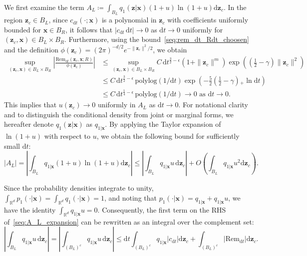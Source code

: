 We first examine the term $A_L\coloneq\int_{B_L}q_1(\bm z|\bm x)(1+u)\ln(1+u)\mathrm d\bm z_c$. In the region $\bm z_c\in B_L$, since $c_{\mathrm dt}(\cdot;\bm x)$ is a polynomial in $\bm z_c$ 
with coefficients uniformly bounded for $\bm x\in B_R$, it follows that $|c_{\mathrm dt}\,\mathrm dt|\rightarrow0$ as $\mathrm dt\rightarrow0$ uniformly for $(\bm z_c,\bm x)\in B_L\times B_R$. Furthermore, using the bound~\eqref{seq:rem_dt_Rdt_choosen} and the definition $\phi(\bm z_c)=(2\pi)^{-d/2}e^{-\|\bm z_c\|^2/2}$, we obtain
\begin{equation}
\begin{aligned}
    \sup_{(\bm z_c,\bm x)\in B_L\times B_R}
    \left|\frac{\mathrm{Rem}_{\mathrm dt}(\bm z_c,\bm x;R)}{\phi(\bm z_c)}\right|
    &\leq
    \sup_{(\bm z_c,\bm x)\in B_L\times B_R}
    C\,\mathrm dt^{\frac{3}{2}-\epsilon}(1+\|\bm z_c\|^m)
    \exp\!\left(\!\left(\frac{1}{2}-\gamma\right)\|\bm z_c\|^2\right)
    \\
    &\leq
    C\,\mathrm dt^{\frac{3}{2}-\epsilon}\,
    \text{polylog}(1/\mathrm dt)
    \exp\!\left(-\frac{5}{2}\left(\frac{1}{2}-\gamma\right)\!\!_+ \ln\mathrm dt\right)
    \\
    &\leq C\,\mathrm dt^{\frac{1}{4}-\epsilon}\,
    \text{polylog}(1/\mathrm dt)
    \rightarrow0
    \text{ as }\mathrm dt\rightarrow 0.
\end{aligned}
\label{seq:rem_over_q_bound_compact_RL}
\end{equation}
This implies that $u(\bm z_c)\rightarrow0$ uniformly in $A_L$ as $\mathrm dt\rightarrow0$. For notational clarity and to distinguish the conditional density from joint or marginal forms, we hereafter denote $q_1(\bm z|\bm x)$ as $q_{1|\bm x}$. By applying the Taylor expansion of $\ln(1+u)$ with respect to $u$, we obtain the following bound for sufficiently small $\mathrm dt$:
\begin{equation}
    |A_L|
    =
    \left|\int_{B_L}q_{1|\bm x}(1+u)\ln(1+u)\mathrm d\bm z_c\right|
    \leq
    \left|\int_{B_L}q_{1|\bm x}u\,\mathrm d\bm z_c\right|
    +O\!\left(
    \int_{B_L}q_{1|\bm x}u^2\mathrm d\bm z_c\right)
    \label{seq:A_L_expansion}.
\end{equation}

Since the probability densities integrate to unity, $\int_{\mathbb R^d} p_1(\cdot|\bm x)=\int_{\mathbb R^d} q_1(\cdot|\bm x)=1$, and noting that $p_1(\cdot|\bm x)=q_{1|\bm x}+q_{1|\bm x}u$, we have the identity $\int_{\mathbb R^d} q_{1|\bm x}u=0$. Consequently, the first term on the RHS of~\eqref{seq:A_L_expansion} can be rewritten as an integral over the complement set:
\begin{equation}
    \left|\int_{B_L}q_{1|\bm x}u\,\mathrm d\bm z_c\right|
    =\left|\int_{(B_L)^c}q_{1|\bm x}u\,\mathrm d\bm z_c\right|
    \leq\mathrm dt\int_{(B_L)^c}q_{1|\bm x}|c_{\mathrm dt}|\mathrm d\bm z_c
    +\int_{(B_L)^c}|\mathrm{Rem}_{\mathrm dt}|\mathrm d\bm z_c.
    \label{seq:q1_u_integral_bound}
\end{equation}

